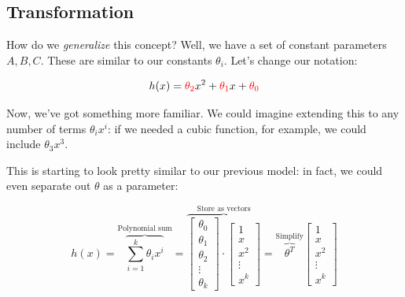     \subsecdiv
    
    \subsection*{Transformation}
    
        How do we \textit{generalize} this concept? Well, we have a set of constant parameters $A, B, C$. These are similar to our constants $\theta_i$. Let's change our notation:
    
        \begin{equation}
            h(x) = \textcolor{red}{\theta_2} x^2 + \textcolor{red}{\theta_1} x + \textcolor{red}{\theta_0}
        \end{equation}
    
        Now, we've got something more familiar. We could imagine extending this to any number of terms $\theta_i x^i$: if we needed a cubic function, for example, we could include $\theta_3 x^3$.

        This is starting to look pretty similar to our previous model: in fact, we could even separate out $\theta$ as a parameter:

        \begin{equation}
            h(x) = 
            \overbrace{
                \sum_{i=1}^{k}
                \theta_i x^i
            }^{\text{Polynomial sum}}
            =
            \overbrace{
            \begin{bmatrix}
             \theta_0 \\ \theta_1 \\ \theta_2 \\ \vdots \\ \theta_k
            \end{bmatrix}
            \cdot 
            \begin{bmatrix}
                1 \\ x \\ x^2 \\ \vdots \\ x^k
            \end{bmatrix}
            }^{\text{Store as vectors}}
            = 
            \overbrace{
            \theta^T
            }^{\text{Simplify}}
            \begin{bmatrix}
                1 \\ x \\ x^2 \\ \vdots \\ x^k
            \end{bmatrix}
        \end{equation}

